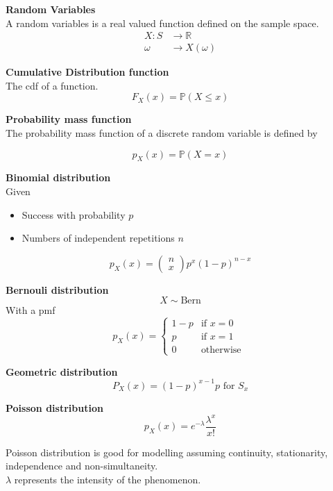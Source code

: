 \textbf{Random Variables}\\
A random variables is a real valued function defined on the sample space.\\
\begin{align*}
X:S &\rightarrow \mathbb{R} \\
\omega &\rightarrow X(\omega) 
\end{align*}

\textbf{Cumulative Distribution function}\\
The cdf of a function.\\

$$F_X (x) = \mathbb{P}(X \leq x)$$

\textbf{Probability mass function}\\
The probability mass function of a discrete random variable is defined by 

$$p_X(x) = \mathbb{P}(X=x)$$

\textbf{Binomial distribution}\\

Given 
\begin{itemize}
\item Success with probability $p$
\item Numbers of independent repetitions $n$
\end{itemize}

$$p_X(x) = \left ( \begin{matrix} n \\ x \end{matrix} \right ) p^x (1-p)^{n-x}$$

\textbf{Bernouli distribution}\\
$$X \sim \text{Bern}$$
With a pmf
$$p_X(x) = \begin{cases}1-p & \text{if } x = 0 \\ p & \text{if } x= 1 \\ 0 & \text{otherwise } \end{cases}$$ 

\textbf{Geometric distribution}
$$P_X(x) = (1-p)^{x-1} p \text{ for } S_x$$

\textbf{Poisson distribution}
$$p_X(x) = e^{-\lambda} \frac{\lambda^x}{x!}$$

Poisson distribution is good for modelling assuming continuity, stationarity, independence and non-simultaneity.\\

$\lambda$ represents the intensity of the phenomenon.\\


